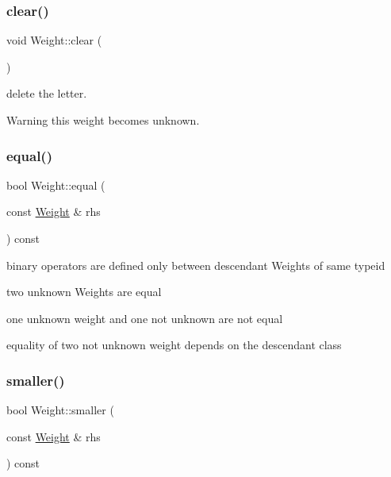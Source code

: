 \subsubsection{\texorpdfstring{clear()}{clear()}}
{\footnotesize\ttfamily void Weight\+::clear (\begin{DoxyParamCaption}{ }\end{DoxyParamCaption})}



delete the letter. 

\begin{DoxyWarning}{Warning}
this weight becomes unknown. 
\end{DoxyWarning}
\mbox{\label{group__weight_ga11236e38c2dc7cc66a367c2ea5921c1e}} 
\subsubsection{\texorpdfstring{equal()}{equal()}\hspace{0.1cm}{\footnotesize\ttfamily [4/4]}}
{\footnotesize\ttfamily bool Weight\+::equal (\begin{DoxyParamCaption}\item[{const \mbox{\hyperlink{classWeight}{Weight}} \&}]{rhs }\end{DoxyParamCaption}) const\hspace{0.3cm}{\ttfamily [protected]}}



binary operators are defined only between descendant Weights of same typeid 


\begin{DoxyItemize}
\item two unknown Weights are equal
\item one unknown weight and one not unknown are not equal
\item equality of two not unknown weight depends on the descendant class 
\end{DoxyItemize}\mbox{\label{group__weight_gab3a3a5fb989514e5673582b9a7107d97}} 
\subsubsection{\texorpdfstring{smaller()}{smaller()}\hspace{0.1cm}{\footnotesize\ttfamily [4/4]}}
{\footnotesize\ttfamily bool Weight\+::smaller (\begin{DoxyParamCaption}\item[{const \mbox{\hyperlink{classWeight}{Weight}} \&}]{rhs }\end{DoxyParamCaption}) const\hspace{0.3cm}{\ttfamily [protected]}}


